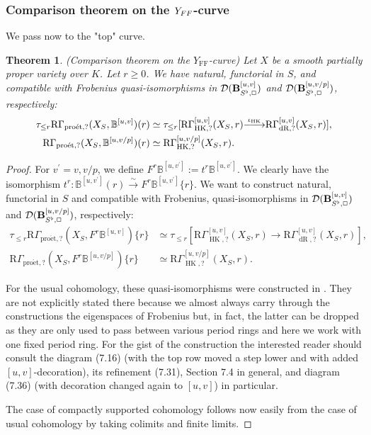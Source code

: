 \documentclass[10pt,reqno]{amsart}
\newtheorem{theorem}[equation]{Theorem}
\theoremstyle{definition}
\theoremstyle{remark}
\def\lomapr#1{\smash{\mathop{\relbar\joinrel\longrightarrow}\limits^{#1}}}
\newcommand{\dr}{\operatorname{dR} }
\newcommand{\proeet}{\operatorname{pro\acute{e}t} }
\newcommand{\hk}{\operatorname{HK} }
\newcommand{\FF}{\operatorname{FF} }
\newcommand{\sd}{{\mathcal{D}}}
\numberwithin{equation}{section}
\def\R{{\mathrm R}}
\numberwithin{equation}{section}
\begin{document}
   \subsubsection{Comparison theorem on the $Y_{\rm FF}$-curve} We pass now to the "top" curve. 
\begin{theorem}{\rm (Comparison theorem on the $Y_{\FF}$-curve)} \label{hot1} 
Let $X$ be a smooth partially proper variety over $K$.  Let $r\geq 0$. We have  natural, functorial in $S$, and compatible with Frobenius  quasi-isomorphisms in $\sd(\B^{[u,v]}_{S^{\flat},\Box})$ 
and $\sd(\B^{[u,v/p]}_{S^{\flat},\Box})$, respectively:
\begin{align}\label{kin1}
\tau_{\leq r}\R\Gamma_{\proeet,?}(X_S,{\mathbb B}^{[u,v]})(r) & \simeq \tau_{\leq r}[\R\Gamma^{{[u,v]}}_{\hk,?}(X_S,r)\lomapr{\iota_{\hk}} \R\Gamma_{\dr,?}^{{[u,v]}}(X_S,r)],\\
\R\Gamma_{\proeet,?}(X_S,{\mathbb B}^{[u,v/p]})(r) & \simeq \R\Gamma^{{[u,v/p]}}_{\hk,?}(X_S,r).\notag
\end{align}
\end{theorem}
\begin{proof} For $v^{\prime}=v,v/p$, we define $F^r{\mathbb B}^{[u,v^{\prime}]}:=t^r{\mathbb B}^{[u,v^{\prime}]}$. %
We clearly have the isomorphism
$
t^r:  {\mathbb B}^{[u,v^{\prime}]}(r)\stackrel{\sim}{\to} F^r{\mathbb B}^{[u,v^{\prime}]}\{r\}.
$
We want to construct natural, functorial in $S$ and compatible with Frobenius,
 quasi-isomorphisms in $\sd(\B^{[u,v]}_{S^{\flat},\Box})$ and $\sd(\B^{[u,v/p]}_{S^{\flat},\Box})$, respectively:
\begin{align*}
\tau_{\leq r}\R\Gamma_{\proeet,?}(X_S, F^r{\mathbb B}^{[u,v]})\{r\} & \simeq \tau_{\leq r}[\R\Gamma^{{[u,v]}}_{\hk,?}(X_S,r)\to \R\Gamma_{\dr,?}^{{[u,v]}}(X_S,r)],\\
\R\Gamma_{\proeet,?}(X_S, F^r{\mathbb B}^{[u,v/p]})\{r\} & \simeq \R\Gamma^{{[u,v/p]}}_{\hk,?}(X_S,r).
\end{align*}
 
  For the usual cohomology, these quasi-isomorphisms were constructed  in \cite[Sec.\,7]{CN4}. They are  not explicitly stated there because we almost always carry through the constructions the eigenspaces of Frobenius but, in fact, the latter   can be dropped
 as they are only used to pass between various period rings and here we work with one fixed period ring.  For the gist of the construction the interested reader should consult  the diagram (7.16) (with the top row moved a step lower and with  added  $[u,v]$-decoration), its refinement (7.31), Section 7.4 in general, and diagram (7.36) (with decoration changed again to $[u,v]$) in particular.

  The case of   compactly supported cohomology follows now easily from the case of usual cohomology by taking  colimits and finite limits. 
\end{proof}
 
\end{document}
